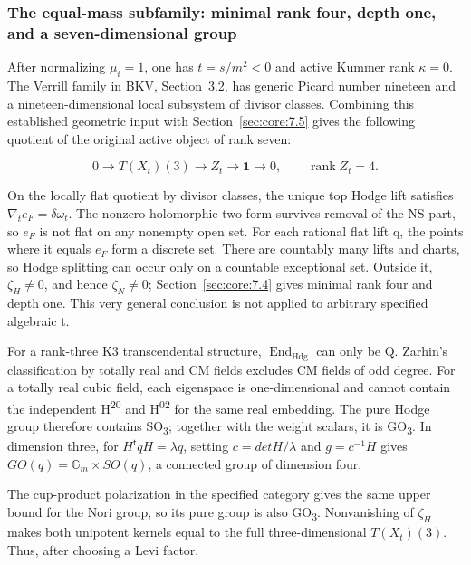 \documentclass[11pt,a4paper,oneside]{article}
\theoremstyle{plain}
\theoremstyle{definition}
\theoremstyle{remark}
\numberwithin{equation}{section}
\begin{document}
\subsubsection{The equal-mass subfamily: minimal rank four, depth one, and a seven-dimensional group}\label{sec:core:8.1}

After normalizing \(\mu _i=1\), one has \(t=s/m^{2}<0\) and active Kummer rank \(\kappa =0\). The Verrill family in BKV, Section~3.2, has generic Picard number nineteen and a nineteen-dimensional local subsystem of divisor classes. \cite{bkv} Combining this established geometric input with Section~\ref{sec:core:7.5} gives the following quotient of the original active object of rank seven:

\begin{equation}
0\to T(X_t)(3)\to Z_t\to\mathbf1\to0,
                    \qquad \operatorname{rank}Z_t=4.
\end{equation}

On the locally flat quotient by divisor classes, the unique top Hodge lift satisfies \(\nabla _t e_F=\delta \omega _t\). The nonzero holomorphic two-form survives removal of the NS part, so \(e_F\) is not flat on any nonempty open set. For each rational flat lift q, the points where it equals \(e_F\) form a discrete set. There are countably many lifts and charts, so Hodge splitting can occur only on a countable exceptional set. Outside it, \(\zeta _H\ne 0\), and hence \(\zeta _N\ne 0\); Section~\ref{sec:core:7.4} gives minimal rank four and depth one. This very general conclusion is not applied to arbitrary specified algebraic t.

For a rank-three K3 transcendental structure, \(\operatorname{End}_{\mathrm{Hdg}}\) can only be Q. Zarhin's classification by totally real and CM fields \cite{zarhin} excludes CM fields of odd degree. For a totally real cubic field, each eigenspace is one-dimensional and cannot contain the independent H\textsuperscript{20} and H\textsuperscript{02} for the same real embedding. The pure Hodge group therefore contains SO\textsubscript{3}; together with the weight scalars, it is GO\textsubscript{3}. In dimension three, for \(H^{\mathsf t}qH=\lambda q\), setting \(c=detH/\lambda \) and \(g=c^{-1}H\) gives \(GO(q)=\mathbb G_m\times SO(q)\), a connected group of dimension four.

The cup-product polarization in the specified category gives the same upper bound for the Nori group, so its pure group is also GO\textsubscript{3}. Nonvanishing of \(\zeta _H\) makes both unipotent kernels equal to the full three-dimensional \(T(X_t)(3)\). Thus, after choosing a Levi factor,
\end{document}
